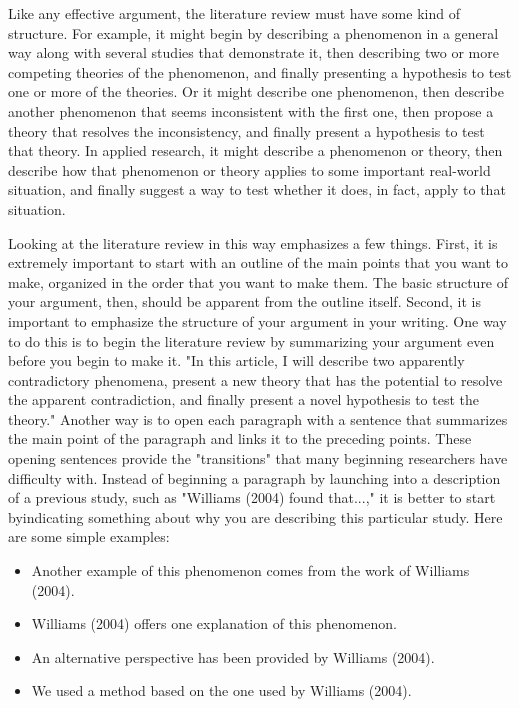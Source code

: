 Like any effective argument, the literature review must have some kind of structure. For example, it might begin by describing a phenomenon in a general way along with several studies that demonstrate it, then describing two or more competing theories of the phenomenon, and finally presenting a hypothesis to test one or more of the theories. Or it might describe one phenomenon, then describe another phenomenon that seems inconsistent with the first one, then propose a theory that resolves the inconsistency, and finally present a hypothesis to test that theory. In applied research, it might describe a phenomenon or theory, then describe how that phenomenon or theory applies to some important real-world situation, and finally suggest a way to test whether it does, in fact, apply to that situation. 

Looking at the literature review in this way emphasizes a few things. First, it is extremely important to start with an outline of the main points that you want to make, organized in the order that you want to make them. The basic structure of your argument, then, should be apparent from the outline itself. Second, it is important to emphasize the structure of your argument in your writing. One way to do this is to begin the literature review by summarizing your argument even before you begin to make it. "In this article, I will describe two apparently contradictory phenomena, present a new theory that has the potential to resolve the apparent contradiction, and finally present a novel hypothesis to test the theory." Another way is to open each paragraph with a sentence that summarizes the main point of the paragraph and links it to the preceding points. These opening sentences provide the "transitions" that many beginning researchers have difficulty with. Instead of beginning a paragraph by launching into a description of a previous study, such as "Williams (2004) found that...," it is better to start byindicating something about why you are describing this particular study. Here are some simple examples:


\begin{itemize}
\item Another example of this phenomenon comes from the work of Williams (2004).

\item Williams (2004) offers one explanation of this phenomenon.

\item An alternative perspective has been provided by Williams (2004).

\item We used a method based on the one used by Williams (2004).

\end{itemize}



